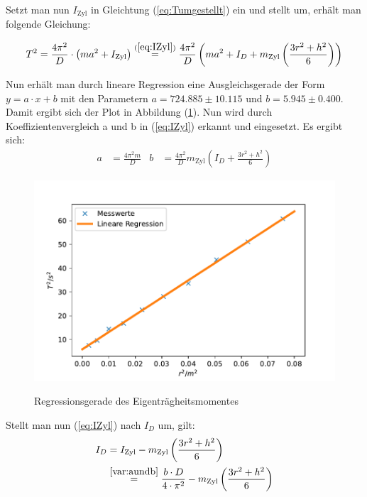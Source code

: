 Setzt man nun $I_{\text{Zyl}}$ in Gleichtung (\ref{eq:Tumgestellt}) ein und stellt um, erhält man folgende Gleichung:

\begin{equation}
  T^2 = \frac{4 \pi^2}{D} \cdot \left( ma^2 + I_{\text{Zyl}} \right) \stackrel{(\ref{eq:IZyl})}{=} 
  \frac{4 \pi^2}{D} \left( ma^2 + I_{D} + m_{\text{Zyl}}  \left( \frac{3 r^2 + h^2}{6} \right) \right)
\end{equation}

Nun erhält man durch lineare Regression eine Ausgleichsgerade der Form $y = a \cdot x + b$ mit den Parametern
$a = 724.885 ± 10.115$ und $b = 5.945 ± 0.400$. Damit ergibt sich der Plot in Abbildung (\ref{fig:Lineareregression}).
Nun wird durch Koeffizientenvergleich a und b in (\ref{eq:IZyl}) erkannt und eingesetzt.
Es ergibt sich:
\begin{align} \label{var:aundb}
  a & = \frac{4 \pi^2 m}{D} & b & = \frac{4 \pi^2}{D} m_{\text{Zyl}}  \left(I_{D} + \frac{3 r^2 + h^2}{6} \right)
\end{align}

\begin{figure}
  \caption{Regressionsgerade des Eigenträgheitsmomentes}
  \centering
  \includegraphics{pictures/Lineare Regression.pdf}
  \label{fig:Lineareregression}
\end{figure}

Stellt man nun (\ref{eq:IZyl}) nach $I_{D}$ um, gilt:
\begin{equation*}   %
  \begin{split}
  I_{D} {} &= I_{\text{Zyl}} - m_{\text{Zyl}}  \left( \frac{3 r^2 + h^2}{6} \right) \\
    &\stackrel{\ref{var:aundb}}{=} \frac{b \cdot D}{4 \cdot \pi^2} - m_{\text{Zyl}}  \left( \frac{3 r^2 + h^2}{6} \right)
  \end{split}
\end{equation*}

